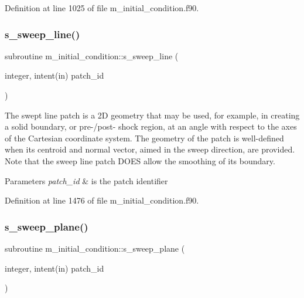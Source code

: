Definition at line 1025 of file m\+\_\+initial\+\_\+condition.\+f90.

\mbox{\label{namespacem__initial__condition_ab056c04c30f55423904517abe61ebd99}} 
\subsubsection{\texorpdfstring{s\+\_\+sweep\+\_\+line()}{s\_sweep\_line()}}
{\footnotesize\ttfamily subroutine m\+\_\+initial\+\_\+condition\+::s\+\_\+sweep\+\_\+line (\begin{DoxyParamCaption}\item[{integer, intent(in)}]{patch\+\_\+id }\end{DoxyParamCaption})}



The swept line patch is a 2D geometry that may be used, for example, in creating a solid boundary, or pre-\//post-\/ shock region, at an angle with respect to the axes of the Cartesian coordinate system. The geometry of the patch is well-\/defined when its centroid and normal vector, aimed in the sweep direction, are provided. Note that the sweep line patch D\+O\+ES allow the smoothing of its boundary. 


\begin{DoxyParams}{Parameters}
{\em patch\+\_\+id} & is the patch identifier \\
\hline
\end{DoxyParams}


Definition at line 1476 of file m\+\_\+initial\+\_\+condition.\+f90.

\mbox{\label{namespacem__initial__condition_a51f30d0a86584bdc757c22ebf7993e88}} 
\subsubsection{\texorpdfstring{s\+\_\+sweep\+\_\+plane()}{s\_sweep\_plane()}}
{\footnotesize\ttfamily subroutine m\+\_\+initial\+\_\+condition\+::s\+\_\+sweep\+\_\+plane (\begin{DoxyParamCaption}\item[{integer, intent(in)}]{patch\+\_\+id }\end{DoxyParamCaption})}



